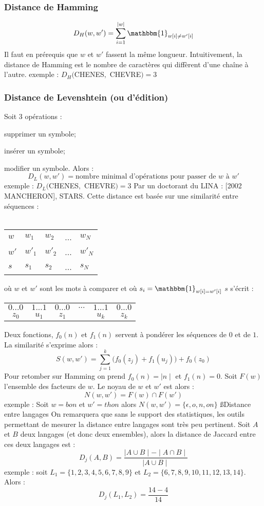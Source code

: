 \documentclass[a4paper,11pt]{article}
\begin{document}
  \subsubsection{Distance de Hamming}
  \[
  D_H(w, w') = \sum^{\mid{}w\mid}_{i = 1} \mathbbm{1}_{w[i] \neq w'[i]}
  \]
  \p Il faut en prérequis que $w$ et $w'$ fassent la même longueur.
  Intuitivement, la distance de Hamming est le nombre de caractères qui
  diffèrent d'une chaîne à l'autre.
  \p exemple : $D_H($CHENES$,$ CHEVRE$)=3$
  \subsubsection{Distance de Levenshtein (ou d'édition)}
  \p Soit 3 opérations :\\
  \bi
   \item supprimer un symbole;
   \item insérer un symbole;
   \item modifier un symbole.
  \ei
  \p Alors :
  \[
  D_L(w, w') = \text{nombre minimal d'opérations pour passer de }w\text{ à }w'
  \]
  \p exemple : $D_L($CHENES$,$ CHEVRE$)=3$
  \p Par un doctorant du LINA : [2002 MANCHERON], STARS.
  \p Cette distance est basée sur une similarité entre séquences :\\ \\
  \begin{tabular}{ l | l l l l }
   $w$  & $w_1$  & $w_2$  & ... & $w_N$  \\
   $w'$ & $w'_1$ & $w'_2$ & ... & $w'_N$ \\ \hline
   $s$  & $s_1$ & $s_2$ & ... & $s_N$ \\
  \end{tabular}
  \p où $w$ et $w'$ sont les mots à comparer et où
  $s_i=\mathbbm{1}_{w[i] = w'[i]}$
  \p $s$ s'écrit :
  \begin{tabular}{ c c c c c c }
   $0...0$  & $1...1$ & $0...0$ & $...$ & $1...1$ & $0...0$ \\
   $z_0$    & $u_1$   & $z_1$   &       & $u_k$   & $z_k$   \\
  \end{tabular}
  \p Deux fonctions, $f_0(n)$ et $f_1(n)$ servent à pondérer les séquences de
  $0$ et de $1$. La similarité s'exprime alors :
  \[
  S(w, w') = \sum^k_{j = 1}\bigg(f_0(z_j) + f_1(u_j)\bigg) + f_0(z_0)
  \]
  \p Pour retomber sur Hamming on prend $f_0(n) = \mid{}n\mid$ et $f_1(n) = 0$.
  Soit $F(w)$ l'ensemble des facteurs de $w$. Le noyau de $w$ et $w'$ est
  alors :
  \[
  N(w, w') = F(w) \cap F(w')
  \]
  \p exemple : Soit $w = bon$ et $w' = thon$ alors
  $N(w, w') = \{\epsilon, o, n, on\}$
 \ss{Distance entre langages}
 On remarquera que sans le support des statistiques, les outils
 permettant de mesurer la distance entre langages sont très peu
 pertinent.
  Soit $A$ et $B$ deux langages (et donc deux ensembles), alors la distance de
  Jaccard entre ces deux langages est :
  \[
  D_j(A, B) = \frac{\mid A \cup B \mid - \mid A \cap B \mid}{\mid A \cup B \mid}
  \]
  \p exemple : soit $L_1 = \{1, 2, 3, 4, 5, 6, 7, 8, 9\}$ et
  $L_2 = \{6, 7, 8, 9, 10, 11, 12, 13, 14\}$. Alors :
  \[
  D_j(L_1, L_2) = \frac{14 - 4}{14}
  \]
\end{document}
